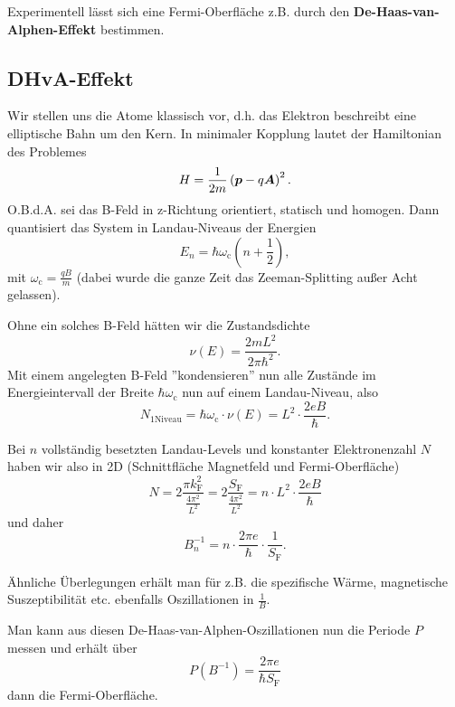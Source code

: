 Experimentell lässt sich eine Fermi-Oberfläche z.B. durch den \textbf{De-Haas-van-Alphen-Effekt} bestimmen.

\subsection{DHvA-Effekt}
Wir stellen uns die Atome klassisch vor, d.h. das Elektron beschreibt eine elliptische Bahn um den Kern.
In minimaler Kopplung lautet der Hamiltonian des Problemes
\begin{equation*}
	H = \frac{1}{2m}\left(\boldsymbol{p}-q\boldsymbol{A}\right)^2.
\end{equation*}
O.B.d.A. sei das B-Feld in z-Richtung orientiert, statisch und homogen.
Dann quantisiert das System in Landau-Niveaus der Energien
\begin{equation*}
	E_n = \hbar\omega_\text{c}\left(n+\frac{1}{2}\right),
\end{equation*}
mit $\omega_\text{c}= \frac{qB}{m}$ (dabei wurde die ganze Zeit das Zeeman-Splitting außer Acht gelassen).

Ohne ein solches B-Feld hätten wir die Zustandsdichte
\begin{equation*}
	\nu(E) = \frac{2mL^2}{2\pi\hbar^2}.
\end{equation*}
Mit einem angelegten B-Feld ''kondensieren'' nun alle Zustände im Energieintervall der Breite $\hbar\omega_\text{c}$ nun auf einem Landau-Niveau, also
\begin{equation*}
	N_\text{1Niveau} = \hbar\omega_\text{c}\cdot\nu(E) = L^2\cdot\frac{2eB}{\hbar}.
\end{equation*}

Bei $n$ vollständig besetzten Landau-Levels und konstanter Elektronenzahl $N$ haben wir also in 2D (Schnittfläche Magnetfeld und Fermi-Oberfläche)
\begin{equation*}
	N = 2\frac{\pi k_\text{F}^2}{\frac{4\pi^2}{L^2}} = 2\frac{S_\text{F}}{\frac{4\pi^2}{L^2}} = n\cdot L^2\cdot\frac{2eB}{\hbar}
\end{equation*}
und daher
\begin{equation*}
	B_n^{-1} = n\cdot\frac{2\pi e}{\hbar}\cdot\frac{1}{S_\text{F}}.
\end{equation*}

Ähnliche Überlegungen erhält man für z.B. die spezifische Wärme, magnetische Suszeptibilität etc. ebenfalls Oszillationen in $\frac{1}{B}$.

Man kann aus diesen De-Haas-van-Alphen-Oszillationen nun die Periode $P$ messen und erhält über
\begin{equation*}
	P(B^{-1}) = \frac{2\pi e}{\hbar S_\text{F}}
\end{equation*}
dann die Fermi-Oberfläche.
